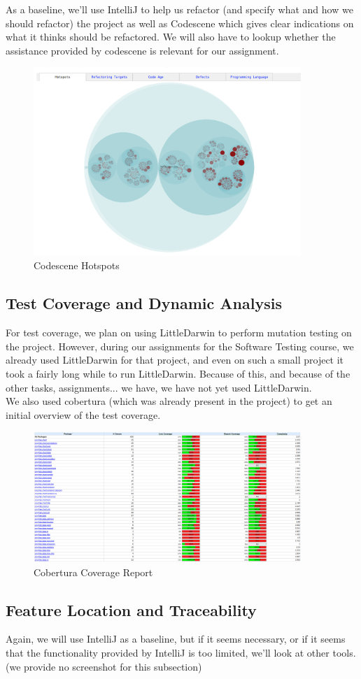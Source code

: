 \documentclass{article}
\begin{document}
As a baseline, we'll use IntelliJ to help us refactor (and specify what and how we should refactor) the project as well as Codescene which gives clear indications on what it thinks should be refactored. We will also have to lookup whether the assistance provided by codescene is relevant for our assignment.

\begin{figure}[H]
\centering
	\includegraphics[width=0.9\textwidth]{codescene_hotspots.png}
	\caption{Codescene Hotspots}
\end{figure}

\subsection{Test Coverage and Dynamic Analysis}

For test coverage, we plan on using LittleDarwin to perform mutation testing on the project. However, during our assignments for the Software Testing course, we already used LittleDarwin for that project, and even on such a small project it took a fairly long while to run LittleDarwin. Because of this, and because of the other tasks, assignments... we have, we have not yet used LittleDarwin.\\

We also used cobertura (which was already present in the project) to get an initial overview of the test coverage.

\begin{figure}[H]
\centering
	\includegraphics[width=0.9\textwidth]{cobertura_coverage.png}
	\caption{Cobertura Coverage Report}
\end{figure}

\subsection{Feature Location and Traceability}

Again, we will use IntelliJ as a baseline, but if it seems necessary, or if it seems that the functionality provided by IntelliJ is too limited, we'll look at other tools.\\

\noindent
(we provide no screenshot for this subsection)
\end{document}
